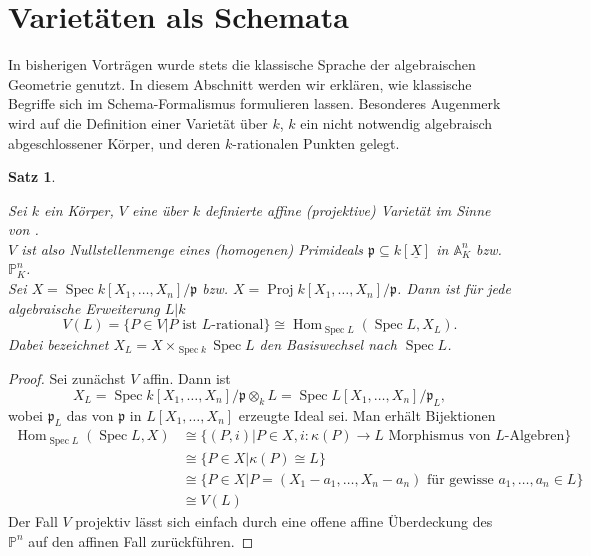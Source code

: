 \documentclass{amsart}
\theoremstyle{plain}
\newtheorem{proposition}[subsection]{Satz}
\theoremstyle{definition}
\newcommand{\projspace}{\mathds{P}}
\newcommand{\affinespace}{\mathds{A}}
\newcommand{\spec}{\operatorname{Spec}}
\newcommand{\proj}{\operatorname{Proj}}
\renewcommand{\hom}{\operatorname{Hom}}
\newcommand{\idealp}{\mathfrak{p}}
\begin{document}
\section{Varietäten als Schemata}
\label{section-varietaeten-als-schemata}

In bisherigen Vorträgen wurde stets die klassische Sprache der algebraischen Geometrie genutzt.
In diesem Abschnitt werden wir erklären, wie klassische Begriffe sich im Schema-Formalismus formulieren lassen.
Besonderes Augenmerk wird auf die Definition einer \glqq Varietät über $k$\grqq, $k$ ein nicht notwendig algebraisch abgeschlossener Körper, und deren $k$-rationalen Punkten gelegt.

\begin{proposition}
	\label{prop-rationale-punkte}

	Sei $k$ ein Körper, $V$ eine über $k$ definierte affine (projektive) Varietät im Sinne von \cite[Kap. I]{silverman}. \\
	$V$ ist also Nullstellenmenge eines (homogenen) Primideals $\idealp \subseteq k[\underline{X}]$ in $\affinespace_K^n$ bzw. $\projspace_K^n$. \\
	Sei $X = \spec k[X_1, \dots, X_n] / \idealp$ bzw. $X = \proj k[X_1, \dots, X_n] / \idealp$. Dann ist für jede algebraische Erweiterung $L | k$
	\begin{equation*}
		V(L) = \{P \in V | P \text{ ist } L\text{-rational}\} \cong \hom_{\spec L}(\spec L, X_L).
	\end{equation*}
	Dabei bezeichnet $X_L = X \times_{\spec k} \spec L$ den Basiswechsel nach $\spec L$.
\end{proposition}
\begin{proof}
	Sei zunächst $V$ affin. Dann ist
	\begin{equation*}
		X_L = \spec k[X_1, \dots, X_n] / \idealp \otimes_k L = \spec L[X_1, \dots, X_n] / \idealp_L,
	\end{equation*}
	wobei $\idealp_L$ das von $\idealp$ in $L[X_1, \dots, X_n]$ erzeugte Ideal sei.
	Man erhält Bijektionen
	\begin{align*}
		\hom_{\spec L}(\spec L, X)
			& \cong \{(P, i) | P \in X, i \colon \kappa(P) \rightarrow L \text{ Morphismus von } L \text{-Algebren}\} \\
			& \cong \{P \in X | \kappa(P) \cong L\} \\
			& \cong \{P \in X | P = (X_1 - a_1, \dots, X_n - a_n) \text{ für gewisse } a_1, \dots, a_n \in L\} \\
			& \cong V(L)
	\end{align*}
	Der Fall $V$ projektiv lässt sich einfach durch eine offene affine Überdeckung des $\projspace^n$ auf den affinen Fall zurückführen.
\end{proof}
\end{document}

